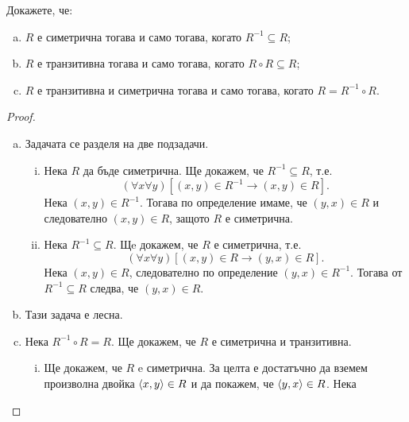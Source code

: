   
\begin{problem}
  Докажете, че:
  \begin{enumerate}[a)]
  \item
    $R$ е симетрична тогава и само тогава, когато $R^{-1}\subseteq R$;
  \item
    $R$ е транзитивна тогава и само тогава, когато $R\circ R\subseteq R$;
  \item
    $R$ е транзитивна и симетрична тогава и само тогава, когато $R = R^{-1}\circ R$.
\end{enumerate}
\end{problem}
\begin{proof}
  \begin{enumerate}[a)]
  \item
    Задачата се разделя на две подзадачи.
    \begin{enumerate}[(i)]
    \item
      Нека $R$ да бъде симетрична. Ще докажем, че $R^{-1}\subseteq R$, т.е.
      \[(\forall x\forall y)[(x,y)\in R^{-1} \rightarrow (x,y)\in R].\]
      Нека $(x,y)\in R^{-1}$. Тогава по определение имаме, че $(y,x)\in R$ и следователно $(x,y)\in R$,
      защото $R$ е симетрична.
    \item
      Нека $R^{-1}\subseteq R$. Щe докажем, че $R$ е симетрична, т.е.
      \[(\forall x\forall y)[(x,y)\in R \rightarrow (y,x)\in R].\]
      Нека $(x,y)\in R$, следователно по определение $(y,x)\in R^{-1}$.
      Тогава от $R^{-1}\subseteq R$ следва, че $(y,x)\in R$.
    \end{enumerate}
  \item
    Тази задача е лесна.
  \item
    Нека $R^{-1}\circ R = R$. Ще докажем, че $R$
    е симетрична и транзитивна.
    \begin{enumerate}[(i)]
    \item
      Ще докажем, че $R$ e симетрична.
      За целта е достатъчно да вземем произволна двойка $\langle{x,y}\rangle \in R$
      и да покажем, че $\langle{y,x}\rangle \in R$.
      Нека 

\end{enumerate}
\end{enumerate}
\end{proof}
